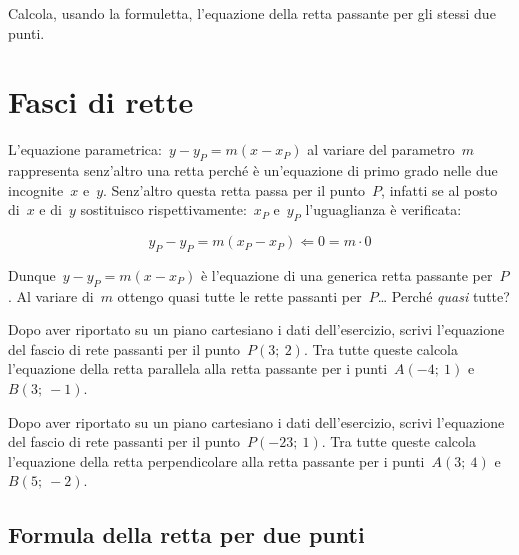 % 

\begin{exrig}
 \begin{esempio}
  Calcola, usando la formuletta, l'equazione della retta passante per gli 
  stessi due punti.
 \end{esempio}
\end{exrig}

\section{Fasci di rette}
\label{sec:retta_fasci}

L'equazione parametrica:~$y - y_P = m (x - x_P)$ al variare del parametro~$m$ 
rappresenta senz'altro una retta perché è un'equazione di primo grado nelle 
due incognite~$x$ e~$y$. Senz'altro questa retta passa per il punto~$P$, 
infatti se al posto di~$x$ e di~$y$ sostituisco 
rispettivamente:~$x_P$ e~$y_P$ l'uguaglianza è verificata:

\[y_P - y_P = m (x_P - x_P) \Leftarrow 0 = m \cdot 0\]

Dunque~$y - y_P = m (x - x_P)$ è l'equazione di una generica retta passante 
per~$P$. Al variare di~$m$ ottengo quasi tutte le rette passanti per~$P$\dots 
Perché \emph{quasi} tutte?

\begin{exrig}
 \begin{esempio}
  Dopo aver riportato su un piano cartesiano i dati dell'esercizio,
  scrivi l'equazione del fascio di rete passanti per il punto~$P(3;~2)$.
  Tra tutte queste calcola l'equazione della retta parallela alla retta 
  passante per i punti~$A(-4;~1)$ e~$B(3;~-1)$.
 \end{esempio}
 \begin{esempio}
  Dopo aver riportato su un piano cartesiano i dati dell'esercizio,
  scrivi l'equazione del fascio di rete passanti per il punto~$P(-23;~1)$.
  Tra tutte queste calcola l'equazione della retta perpendicolare alla retta 
  passante per i punti~$A(3;~4)$ e~$B(5;~-2)$.
 \end{esempio}
\end{exrig}

\subsection{Formula della retta per due punti}


